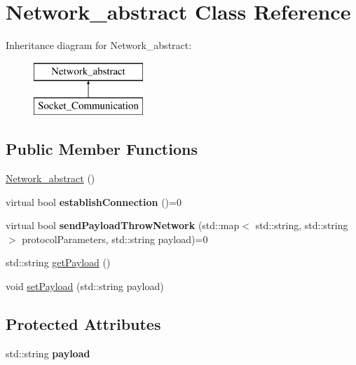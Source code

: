\hypertarget{class_network__abstract}{}\section{Network\+\_\+abstract Class Reference}
\label{class_network__abstract}
Inheritance diagram for Network\+\_\+abstract\+:\begin{figure}[H]
\begin{center}
\leavevmode
\includegraphics[height=2.000000cm]{class_network__abstract}
\end{center}
\end{figure}
\subsection*{Public Member Functions}
\begin{DoxyCompactItemize}
\item 
\mbox{\hyperlink{class_network__abstract_ada3172f8190180cbf9be59b2fd0450c3}{Network\+\_\+abstract}} ()
\item 
\mbox{\label{class_network__abstract_a9ae1b14379a9ad01a16c0c54e761d48d}} 
virtual bool {\bfseries establish\+Connection} ()=0
\item 
\mbox{\label{class_network__abstract_ade6f5946b9c71d3758771508de46e267}} 
virtual bool {\bfseries send\+Payload\+Throw\+Network} (std\+::map$<$ std\+::string, std\+::string $>$ protocol\+Parameters, std\+::string payload)=0
\item 
std\+::string \mbox{\hyperlink{class_network__abstract_a70a5435d01dca002738e44ac148a97b1}{get\+Payload}} ()
\item 
void \mbox{\hyperlink{class_network__abstract_ac5bcf2e989845790f648118b7f382391}{set\+Payload}} (std\+::string payload)
\end{DoxyCompactItemize}
\subsection*{Protected Attributes}
\begin{DoxyCompactItemize}
\item 
\mbox{\label{class_network__abstract_a56ca3ed6ac9c2a0225ea2d0f42f6b03e}} 
std\+::string {\bfseries payload}
\end{DoxyCompactItemize}


